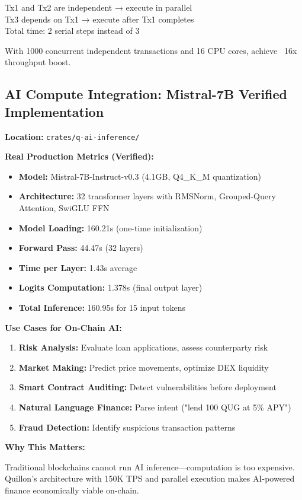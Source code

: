 \documentclass[11pt,a4paper]{article}
\begin{document}
Tx1 and Tx2 are independent → execute in parallel\\
Tx3 depends on Tx1 → execute after Tx1 completes\\
Total time: 2 serial steps instead of 3

With 1000 concurrent independent transactions and 16 CPU cores, achieve ~16x throughput boost.

\subsection{AI Compute Integration: Mistral-7B Verified Implementation}

\textbf{Location:} \texttt{crates/q-ai-inference/}

\textbf{Real Production Metrics (Verified):}
\begin{itemize}[leftmargin=*]
\item \textbf{Model:} Mistral-7B-Instruct-v0.3 (4.1GB, Q4\_K\_M quantization)
\item \textbf{Architecture:} 32 transformer layers with RMSNorm, Grouped-Query Attention, SwiGLU FFN
\item \textbf{Model Loading:} 160.21s (one-time initialization)
\item \textbf{Forward Pass:} 44.47s (32 layers)
\item \textbf{Time per Layer:} 1.43s average
\item \textbf{Logits Computation:} 1.378s (final output layer)
\item \textbf{Total Inference:} 160.95s for 15 input tokens
\end{itemize}

\textbf{Use Cases for On-Chain AI:}
\begin{enumerate}[leftmargin=*]
\item \textbf{Risk Analysis:} Evaluate loan applications, assess counterparty risk
\item \textbf{Market Making:} Predict price movements, optimize DEX liquidity
\item \textbf{Smart Contract Auditing:} Detect vulnerabilities before deployment
\item \textbf{Natural Language Finance:} Parse intent ("lend 100 QUG at 5\% APY")
\item \textbf{Fraud Detection:} Identify suspicious transaction patterns
\end{enumerate}

\textbf{Why This Matters:}

Traditional blockchains cannot run AI inference—computation is too expensive. Quillon's architecture with 150K TPS and parallel execution makes AI-powered finance economically viable on-chain.
\end{document}

